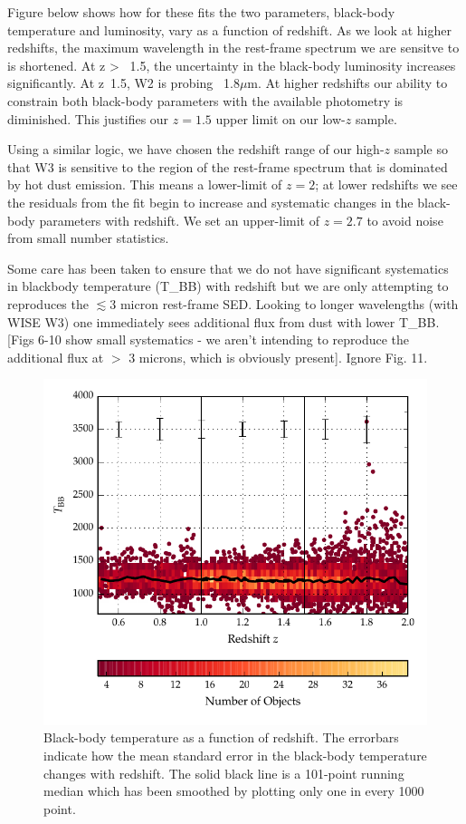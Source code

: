 Figure below shows how for these fits the two parameters, black-body temperature and luminosity, vary as a function of redshift. 
As we look at higher redshifts, the maximum wavelength in the rest-frame spectrum we are sensitve to is shortened. At z >~ 1.5, the uncertainty in the black-body luminosity increases significantly. 
At z~1.5, W2 is probing ~1.8$\mu$m. 
At higher redshifts our ability to constrain both black-body parameters with the available photometry is diminished. 
This justifies our $z=1.5$ upper limit on our low-$z$ sample.  

Using a similar logic, we have chosen the redshift range of our high-$z$ sample so that W3 is sensitive to the region of the rest-frame spectrum that is dominated by hot dust emission. 
This means a lower-limit of $z=2$; at lower redshifts we see the residuals from the fit begin to increase and systematic changes in the black-body parameters with redshift. 
We set an upper-limit of $z=2.7$ to avoid noise from small number statistics.  

Some care has been taken to ensure that we do not have significant systematics in blackbody temperature (T\_BB) with redshift but we are only attempting to reproduces the $\lesssim3$ micron rest-frame SED. 
Looking to longer wavelengths (with WISE W3) one immediately sees additional flux from dust with lower T\_BB. [Figs 6-10 show small systematics - we aren't intending to reproduce the additional flux at $>$ 3 microns, which is obviously present]. Ignore Fig. 11. 


\begin{figure}
  \centering
  \includegraphics[width=\textwidth]{figures/chapter06/bbt_z_errors.pdf}
  \caption{Black-body temperature as a function of redshift. The errorbars indicate how the mean standard error in the black-body temperature changes with redshift. The solid black line is a 101-point running median which has been smoothed by plotting only one in every 1000 point.}
  \label{fig:}
\end{figure}

